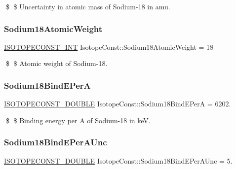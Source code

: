 \$ \$ Uncertainty in atomic mass of Sodium-\/18 in amu. \mbox{\label{group___isotope_const-_sodium-_na18_ga161800ce89dc09d1d218e5f8e3204c2a}} 
\subsubsection{\texorpdfstring{Sodium18\+Atomic\+Weight}{Sodium18AtomicWeight}}
{\footnotesize\ttfamily \mbox{\hyperlink{group___isotope_const-_macros_ga5f18360b3e99483a35c32d789e62621c}{I\+S\+O\+T\+O\+P\+E\+C\+O\+N\+S\+T\+\_\+\+I\+NT}} Isotope\+Const\+::\+Sodium18\+Atomic\+Weight = 18}

\$ \$ Atomic weight of Sodium-\/18. \mbox{\label{group___isotope_const-_sodium-_na18_gaa3286f614f358bcc0ce47aa2031e12d5}} 
\subsubsection{\texorpdfstring{Sodium18\+Bind\+E\+PerA}{Sodium18BindEPerA}}
{\footnotesize\ttfamily \mbox{\hyperlink{group___isotope_const-_macros_ga8f45a7272ce02c0b4c65c44636ed719a}{I\+S\+O\+T\+O\+P\+E\+C\+O\+N\+S\+T\+\_\+\+D\+O\+U\+B\+LE}} Isotope\+Const\+::\+Sodium18\+Bind\+E\+PerA = 6202.}

\$ \$ Binding energy per A of Sodium-\/18 in keV. \mbox{\label{group___isotope_const-_sodium-_na18_ga1e217550378d187f5851f6023e80e818}} 
\subsubsection{\texorpdfstring{Sodium18\+Bind\+E\+Per\+A\+Unc}{Sodium18BindEPerAUnc}}
{\footnotesize\ttfamily \mbox{\hyperlink{group___isotope_const-_macros_ga8f45a7272ce02c0b4c65c44636ed719a}{I\+S\+O\+T\+O\+P\+E\+C\+O\+N\+S\+T\+\_\+\+D\+O\+U\+B\+LE}} Isotope\+Const\+::\+Sodium18\+Bind\+E\+Per\+A\+Unc = 5.}

